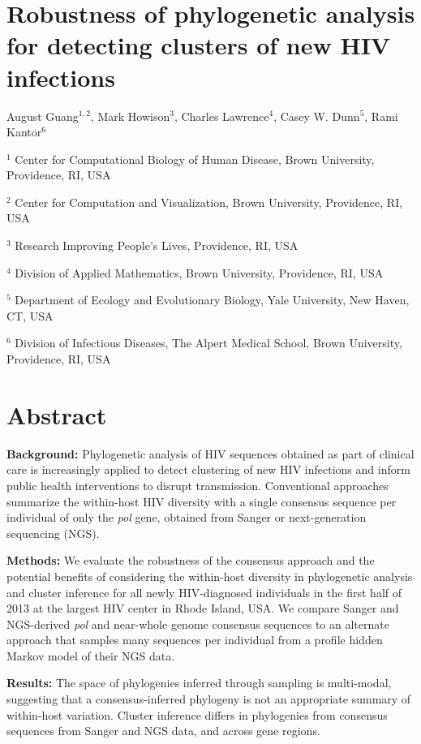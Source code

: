 \documentclass[letterpaper]{article}
\begin{document}
\section*{Robustness of phylogenetic analysis for detecting clusters of new HIV infections}

August Guang$^{1,2}$, Mark Howison$^3$, Charles Lawrence$^4$, Casey W. Dunn$^5$, Rami Kantor$^6$

$^1$ Center for Computational Biology of Human Disease, Brown University, Providence, RI, USA

$^2$ Center for Computation and Visualization, Brown University, Providence, RI, USA

$^3$ Research Improving People's Lives, Providence, RI, USA

$^4$ Division of Applied Mathematics, Brown University, Providence, RI, USA

$^5$ Department of Ecology and Evolutionary Biology, Yale University, New Haven, CT, USA

$^6$ Division of Infectious Diseases, The Alpert Medical School, Brown University, Providence, RI, USA

\doublespace
\section*{Abstract}

\textbf{Background:} Phylogenetic analysis of HIV sequences obtained as part of clinical care is increasingly applied to detect clustering of new HIV infections and inform public health interventions to disrupt transmission. Conventional approaches summarize the within-host HIV diversity with a single consensus sequence per individual of only the \emph{pol} gene, obtained from Sanger or next-generation sequencing (NGS).

\textbf{Methods:} We evaluate the robustness of the consensus approach and the potential benefits of considering the within-host diversity in phylogenetic analysis and cluster inference for all newly HIV-diagnosed individuals in the first half of 2013 at the largest HIV center in Rhode Island, USA. We compare Sanger and NGS-derived \emph{pol} and near-whole genome consensus sequences to an alternate approach that samples many sequences per individual from a profile hidden Markov model of their NGS data.

\textbf{Results:} The space of phylogenies inferred through sampling is multi-modal, suggesting that a consensus-inferred phylogeny is not an appropriate summary of within-host variation. Cluster inference differs in phylogenies from consensus sequences from Sanger and NGS data, and across gene regions.
\end{document}
